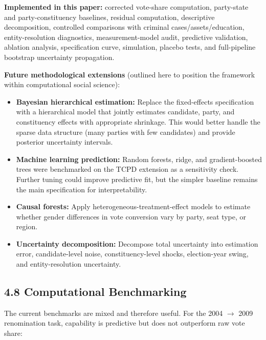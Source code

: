 \documentclass[
]{article}
\providecommand{\tightlist}{%
  \setlength{\itemsep}{0pt}\setlength{\parskip}{0pt}}
\begin{document}
\textbf{Implemented in this paper:} corrected vote-share computation, party-state and party-constituency baselines, residual computation, descriptive decomposition, controlled comparisons with criminal cases/assets/education, entity-resolution diagnostics, measurement-model audit, predictive validation, ablation analysis, specification curve, simulation, placebo tests, and full-pipeline bootstrap uncertainty propagation.

\textbf{Future methodological extensions} (outlined here to position the framework within computational social science):

\begin{itemize}
\tightlist
\item
  \textbf{Bayesian hierarchical estimation:} Replace the fixed-effects specification with a hierarchical model that jointly estimates candidate, party, and constituency effects with appropriate shrinkage. This would better handle the sparse data structure (many parties with few candidates) and provide posterior uncertainty intervals.
\item
  \textbf{Machine learning prediction:} Random forests, ridge, and gradient-boosted trees were benchmarked on the TCPD extension as a sensitivity check. Further tuning could improve predictive fit, but the simpler baseline remains the main specification for interpretability.
\item
  \textbf{Causal forests:} Apply heterogeneous-treatment-effect models to estimate whether gender differences in vote conversion vary by party, seat type, or region.
\item
  \textbf{Uncertainty decomposition:} Decompose total uncertainty into estimation error, candidate-level noise, constituency-level shocks, election-year swing, and entity-resolution uncertainty.
\end{itemize}

\subsection{4.8 Computational Benchmarking}\label{48-computational-benchmarking}

The current benchmarks are mixed and therefore useful. For the 2004 $\rightarrow$ 2009 renomination task, capability is predictive but does not outperform raw vote share:
\end{document}
